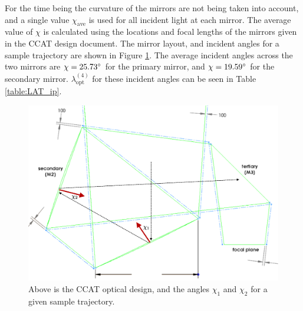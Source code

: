 \documentclass{article}
\theoremstyle{remark}
\newcommand{\tab}{\hspace*{2em}}
\renewcommand{\t}[1]{\text{#1}}
\newcommand{\lo}{\lambda_\t{opt}^{(4)}}
\begin{document}
\tab For the time being the curvature of the mirrors are not being taken into account, and a single value $\chi_\t{ave}$ is used for all incident light at each mirror.
The average value of $\chi$ is calculated using the locations and focal lengths of the mirrors given in the CCAT design document. 
The mirror layout, and incident angles for a sample trajectory are shown in Figure \ref{fig:IncidentAngles}.
The average incident angles across the two mirrors are $\chi = 25.73 \degree$ for the primary mirror, and $\chi = 19.59\degree$ for the secondary mirror.
$\lo$ for these incident angles can be seen in Table \ref{table:LAT_ip}.

\begin{figure}[t!]
	\centering
  \includegraphics[width=.8\linewidth]{IncidentAngles.png}
  \caption{
  Above is the CCAT optical design, and the angles $\chi_1$ and $\chi_2$ for a given sample trajectory.
  }
  \label{fig:IncidentAngles}
\end{figure}
\end{document}
